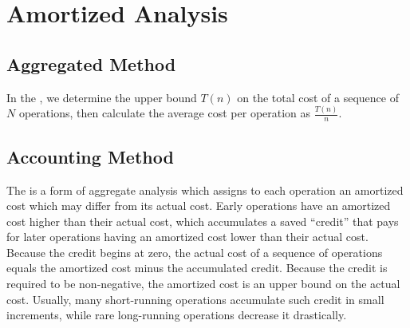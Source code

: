 \chapter{Amortized Analysis}

\section{Aggregated Method}

In the , we determine the upper bound $T(n)$ on the total cost of a sequence of $N$ operations, then calculate the average cost per operation as $\frac{T(n)}{n}$. %

\section{Accounting Method}

The  is a form of aggregate analysis which assigns to each operation an amortized cost which may differ from its actual cost. Early operations have an amortized cost higher than their actual cost, which accumulates a saved ``credit'' that pays for later operations having an amortized cost lower than their actual cost. Because the credit begins at zero, the actual cost of a sequence of operations equals the amortized cost minus the accumulated credit. Because the credit is required to be non-negative, the amortized cost is an upper bound on the actual cost. Usually, many short-running operations accumulate such credit in small increments, while rare long-running operations decrease it drastically.